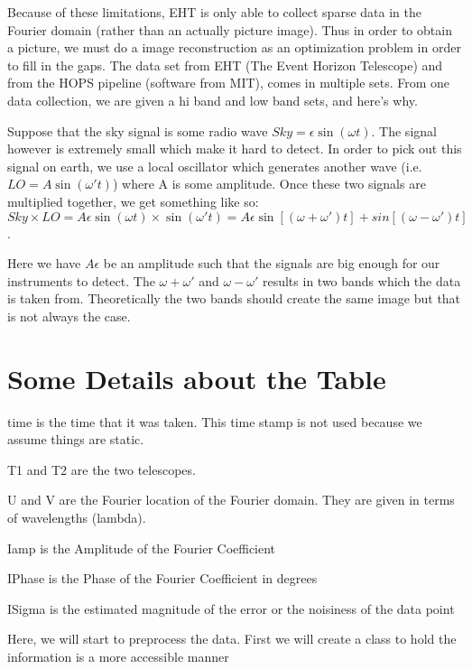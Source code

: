 \documentclass[letterpaper,10pt,english]{jupyterBook}
\begin{document}
\sphinxAtStartPar
Because of these limitations, EHT is only able to collect sparse data in the Fourier domain (rather than an actually picture image). Thus in order to obtain a picture, we must do a image reconstruction as an optimization problem in order to fill in the gaps. The data set from EHT (The Event Horizon Telescope) and from the HOPS pipeline (software from MIT), comes in multiple sets. From one data collection, we are given a hi band and low band sets, and here’s why.

\sphinxAtStartPar
Suppose that the sky signal is some radio wave \(Sky = \epsilon \sin(\omega t)\). The signal however is extremely small which make it hard to detect. In order to pick out this signal on earth, we use a local oscillator which generates another wave (i.e. \(LO = A \sin(\omega't)\)) where A is some amplitude. Once these two signals are multiplied together, we get something like so: \(Sky \times LO = A \epsilon \sin(\omega t) \times \sin(\omega' t) = A \epsilon {\sin[(\omega + \omega')t] + sin [(\omega - \omega')t]}\).

\sphinxAtStartPar
Here we have \(A \epsilon\) be an amplitude such that the signals are big enough for our instruments to detect.
The \(\omega + \omega'\) and \(\omega - \omega'\) results in two bands which the data is taken from. Theoretically the two bands should create the same image but that is not always the case.


\section{Some Details about the Table}
\label{\detokenize{data:some-details-about-the-table}}
\sphinxAtStartPar
time is the time that it was taken. This time stamp is not used because we assume things are static.

\sphinxAtStartPar
T1 and T2 are the two telescopes.

\sphinxAtStartPar
U and V are the Fourier location of the Fourier domain. They are given in terms of wavelengths (lambda).

\sphinxAtStartPar
Iamp is the Amplitude of the Fourier Coefficient

\sphinxAtStartPar
IPhase is the Phase of the Fourier Coefficient in degrees

\sphinxAtStartPar
ISigma is the estimated magnitude of the error or the noisiness of the data point

\sphinxAtStartPar
Here, we will start to preprocess the data. First we will create a class to hold the information is a more accessible manner
\end{document}
